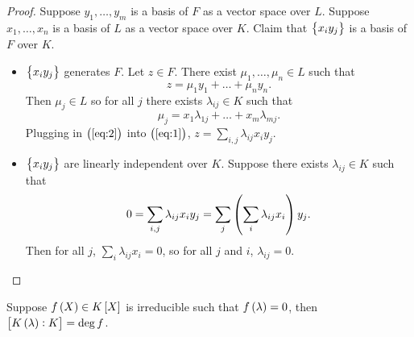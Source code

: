 \begin{proof}
Suppose $ y_1, \dots, y_m $ is a basis of $ F $ as a vector space over $ L $. Suppose $ x_1, \dots, x_n $ is a basis of $ L $ as a vector space over $ K $. Claim that $ \cbr{x_iy_j} $ is a basis of $ F $ over $ K $.
\begin{itemize}
\item $ \cbr{x_iy_j} $ generates $ F $. Let $ z \in F $. There exist $ \mu_1, \dots, \mu_n \in L $ such that
\begin{equation}
\label{eq:1}
z = \mu_1y_1 + \dots + \mu_ny_n.
\end{equation}
Then $ \mu_j \in L $ so for all $ j $ there exists $ \lambda_{ij} \in K $ such that
\begin{equation}
\label{eq:2}
\mu_j = x_1\lambda_{1j} + \dots + x_m\lambda_{mj}.
\end{equation}
Plugging in $ \br{\ref{eq:2}} $ into $ \br{\ref{eq:1}} $, $ z = \sum_{i, j} \lambda_{ij}x_iy_j $.
\item $ \cbr{x_iy_j} $ are linearly independent over $ K $. Suppose there exists $ \lambda_{ij} \in K $ such that
$$ 0 = \sum_{i, j} \lambda_{ij}x_iy_j = \sum_j \br{\sum_i \lambda_{ij}x_i}y_j. $$
Then for all $ j $, $ \sum_i \lambda_{ij}x_i = 0 $, so for all $ j $ and $ i $, $ \lambda_{ij} = 0 $.
\end{itemize}
\end{proof}

\pagebreak

\begin{theorem}
\label{thm:degree}
Suppose $ f\br{X} \in K\sbr{X} $ is irreducible such that $ f\br{\lambda} = 0 $, then $ \sbr{K\br{\lambda} : K} = \deg f $.
\end{theorem}

